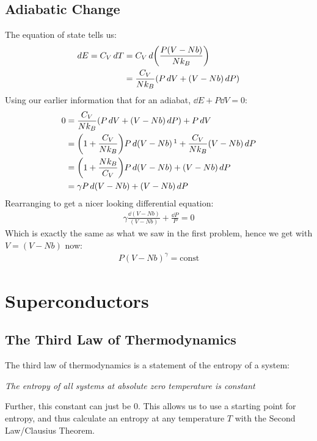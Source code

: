 \documentclass[12pt]{article}
\begin{document}
\subsection{Adiabatic Change}
The equation of state tells us:
\begin{align*}
  \dd{E}=C_V\dd{T}&=C_V\dd{\qty(\frac{P(V-Nb)}{Nk_B})}\\
  &=\frac{C_V}{Nk_B}\qty(P\dd{V}+(V-Nb)\dd{P})
\end{align*}
Using our earlier information that for an adiabat, $\dd{E}+P\dd{V}=0$:
\begin{align*}
  0&=\frac{C_V}{Nk_B}\qty(P\dd{V}+(V-Nb)\dd{P})+P\dd{V}\\
  &=\qty(1+\frac{C_V}{Nk_B})P\dd{(V-Nb)}\footnotemark+
  \frac{C_V}{Nk_B}(V-Nb)\dd{P}\\
  &=\qty(1+\frac{Nk_B}{C_V})P\dd{(V-Nb)}+(V-Nb)\dd{P}\\
  &=\gamma P\dd{(V-Nb)}+(V-Nb)\dd{P}
\end{align*}
Rearranging to get a nicer looking differential equation:
\begin{align*}
  \gamma\frac{\dd{(V-Nb)}}{(V-Nb)}+\frac{\dd{P}}{P}=0
\end{align*}
Which is exactly the same as what we saw in the first problem, hence we get with $V=(V-Nb)$ now:
\begin{align}
  \boxed{P(V-Nb)^\gamma=\text{const}}
\end{align}
\newpage
\section{Superconductors}
\subsection{The Third Law of Thermodynamics}
The third law of thermodynamics is a statement of the entropy of a system:
\begin{center}
  \textit{The entropy of all systems at absolute zero temperature is constant}
\end{center}
Further, this constant can just be $0$. This allows us to use a starting point for entropy, and thus calculate an entropy at any temperature $T$ with the Second Law/Clausius Theorem.
\end{document}
